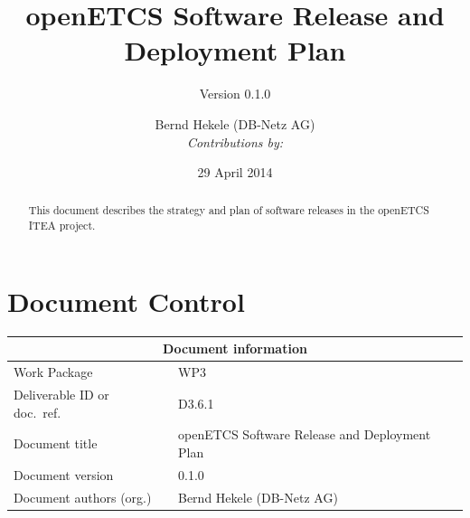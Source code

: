 \documentclass{template/openetcs_report}
\begin{document}
\frontmatter
{}




\title{openETCS Software Release and Deployment Plan}

\subtitle{Version 0.1.0}

\date{29 April 2014}


\author{
Bernd Hekele (DB-Netz AG)\\
\small
{\it Contributions by:} \\}

  




\begin{abstract}

This document describes the strategy and plan of software releases in the openETCS ITEA project.


\end{abstract}

\maketitle
\tableofcontents
\listoffiguresandtables
\newpage

\chapter{Document Control}

\begin{tabular}{|p{4.4cm}|p{8.7cm}|}
  \hline
  \multicolumn{2}{|c|}{Document information} \\
  \hline
  Work Package &  WP3  \\
  Deliverable ID or doc.\ ref.\ & D3.6.1\\
  \hline
  Document title & openETCS Software Release and Deployment Plan\\
  Document version & 0.1.0 \\
  Document authors (org.)  &  Bernd Hekele (DB-Netz AG)\\
  \hline
\end{tabular}
\end{document}
